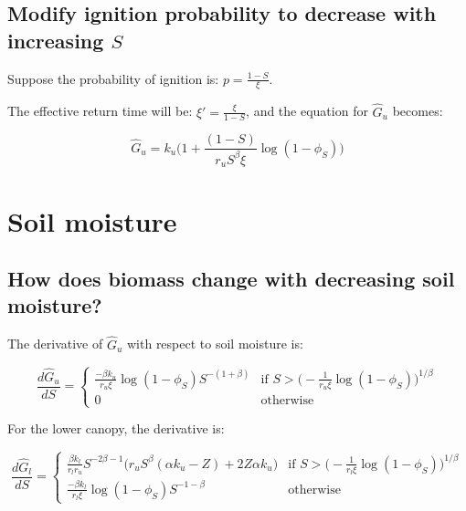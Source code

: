 \documentclass{article}
\begin{document}
\subsection{Modify ignition probability to decrease with increasing $S$}

Suppose the probability of ignition is: $p = \frac{1-S}{\xi}$.

The effective return time will be: $\xi' = \frac{\xi} { 1- S}$, and the equation for $\hat{G}_u $ becomes:

\begin{equation}
\hat{G}_u =
  k_u \big( 1 + \frac{(1-S)}{r_u S^\beta \xi} \log(1-\phi_S) \big)
\end{equation}



\section{Soil moisture}

\subsection{How does biomass change with decreasing soil moisture?}

    The derivative of $\hat G_u$ with respect to soil moisture is:
    
    \begin{equation}
    \frac{ d\hat{G}_u }{dS} =
        \begin{cases}
          \frac{-\beta k_u }{r_u \xi} \log(1-\phi_S) S^{-(1+\beta)}
    		& \text{if  } S > \big( - \frac{1}{r_u \xi }\log (1 - \phi_S)\big)^{1/\beta}
    		\\[10pt]
          0 & \text{otherwise}
        \end{cases}
    \end{equation}
    
    
    For the lower canopy, the derivative is:
    
    \begin{equation}
    \frac{ d\hat{G}_l }{dS} =
        \begin{cases}
    	  \frac{\beta  {k_l} }{{r_l} {r_u}} S^{-2 \beta -1}
    \big( {r_u} S^{\beta }(\alpha  {k_u}  - Z) +2 Z \alpha  {k_u}
       \big)
    	  & \text{if  } S > \big( - \frac{1}{r_l \xi }\log (1 - \phi_S)\big)^{1/\beta}
    		\\[10pt]
            \frac{-\beta k_l }{r_l \xi} \log(1-\phi_S) S^{-1-\beta} & \text{otherwise}
        \end{cases}
    \end{equation}
    
\end{document}
